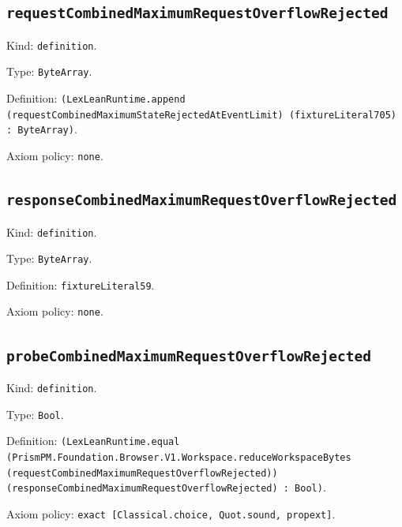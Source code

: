 \documentclass[11pt]{article}
\begin{document}
\subsection*{\texttt{requestCombinedMaximumRequestOverflowRejected}}
\noindent Kind: \texttt{definition}.\par
\noindent Type: \texttt{ByteArray}.\par
\noindent Definition: \texttt{(LexLeanRuntime.append (requestCombinedMaximumStateRejectedAtEventLimit) (fixtureLiteral705) : ByteArray)}.\par
\noindent Axiom policy: \texttt{none}.\par
\subsection*{\texttt{responseCombinedMaximumRequestOverflowRejected}}
\noindent Kind: \texttt{definition}.\par
\noindent Type: \texttt{ByteArray}.\par
\noindent Definition: \texttt{fixtureLiteral59}.\par
\noindent Axiom policy: \texttt{none}.\par
\subsection*{\texttt{probeCombinedMaximumRequestOverflowRejected}}
\noindent Kind: \texttt{definition}.\par
\noindent Type: \texttt{Bool}.\par
\noindent Definition: \texttt{(LexLeanRuntime.equal (PrismPM.Foundation.Browser.V1.Workspace.reduceWorkspaceBytes (requestCombinedMaximumRequestOverflowRejected)) (responseCombinedMaximumRequestOverflowRejected) : Bool)}.\par
\noindent Axiom policy: \texttt{exact [Classical.choice, Quot.sound, propext]}.\par
\end{document}
